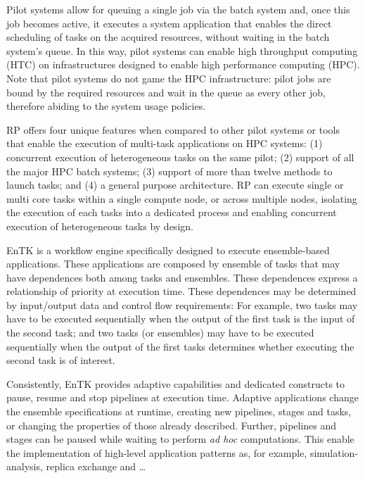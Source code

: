 \documentclass[preprint,12pt, a4paper]{elsarticle}
\begin{document}
Pilot systems allow for queuing a single job via the batch system and, once
this job becomes active, it executes a system application that enables the
direct scheduling of tasks on the acquired resources, without waiting in the
batch system's queue. In this way, pilot systems can enable high throughput
computing (HTC) on infrastructures designed to enable high performance
computing (HPC). Note that pilot systems do not game the HPC infrastructure:
pilot jobs are bound by the required resources and wait in the queue as every
other job, therefore abiding to the system usage policies.

RP offers four unique features when compared to other pilot systems or tools
that enable the execution of multi-task applications on HPC systems: (1)
concurrent execution of heterogeneous tasks on the same pilot; (2) support of
all the major HPC batch systems; (3) support of more than twelve methods to
launch tasks; and (4) a general purpose architecture. RP can execute single
or multi core tasks within a single compute node, or across multiple nodes,
isolating the execution of each tasks into a dedicated process and enabling
concurrent execution of heterogeneous tasks by design.

EnTK is a workflow engine specifically designed to execute ensemble-based
applications. These applications are composed by ensemble of tasks that may
have dependences both among tasks and ensembles. These dependences express a
relationship of priority at execution time. These dependences may be
determined by input/output data and control flow requirements: For example,
two tasks may have to be executed sequentially when the output of the first
task is the input of the second task; and two tasks (or ensembles) may have
to be executed sequentially when the output of the first tasks determines
whether executing the second task is of interest.

Consistently, EnTK provides adaptive capabilities and dedicated constructs to
pause, resume and stop pipelines at execution time. Adaptive applications
change the ensemble specifications at runtime, creating new pipelines, stages
and tasks, or changing the properties of those already described. Further,
pipelines and stages can be paused while waiting to perform \textit{ad hoc}
computations. This enable the implementation of high-level application
patterns as, for example, simulation-analysis, replica exchange and \ldots


\end{document}
